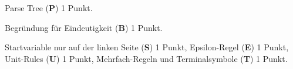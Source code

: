 \begin{bewertung}
\begin{teilaufgaben}
\item
Parse Tree ({\bf P}) 1 Punkt.
\item
Begründung für Eindeutigkeit ({\bf B})  1 Punkt.
\item
Startvariable nur auf der linken Seite ({\bf S}) 1 Punkt,
Epsilon-Regel ({\bf E}) 1 Punkt,
Unit-Rules ({\bf U}) 1 Punkt,
Mehrfach-Regeln und Terminalsymbole ({\bf T}) 1 Punkt.
\end{teilaufgaben}
\end{bewertung}




